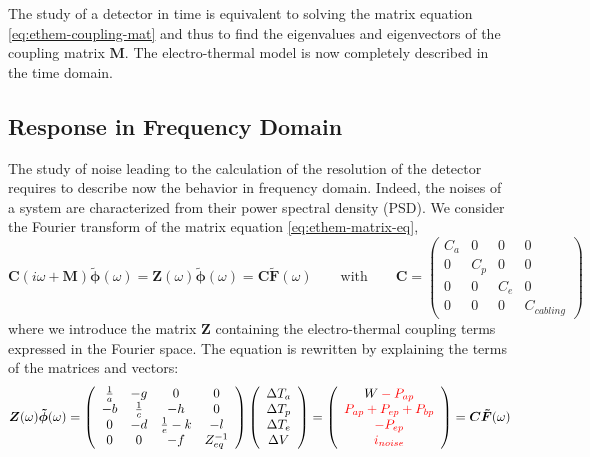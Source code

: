 The study of a detector in time is equivalent to solving the matrix equation \ref{eq:ethem-coupling-mat} and thus to find the eigenvalues and eigenvectors of the coupling matrix $\bm{M}$. The electro-thermal model is now completely described in the time domain.


\subsection{Response in Frequency Domain}
\label{par:ethem-frequency-domain}

The study of noise leading to the calculation of the resolution of the detector requires to describe now the behavior in frequency domain. Indeed, the noises of a system are characterized from their power spectral density (PSD).
We consider the Fourier transform of the matrix equation \ref{eq:ethem-matrix-eq},
\begin{equation}
\bm{C} (i\omega + \bm{M})  \bm{\tilde{\phi}}  (\omega) = \bm{Z} (\omega) \bm{\tilde{\phi}} (\omega)  = \bm{C} \bm{\tilde{F}} (\omega) \qquad \textrm{with} \qquad \bm{C} = \left( \begin{array}{cccc}
 C_a&0&0&0 \\
0&C_p&0&0\\
0&0&C_e&0\\
0&0&0&C_{cabling}
\end{array} \right)
\end{equation}
where we introduce the matrix $\bm{Z}$ containing the electro-thermal coupling terms expressed in the Fourier space. The equation is rewritten by explaining the terms of the matrices and vectors: 
\begin{equation}
\label{z-mat}
\bm{Z} (\omega) \bm{\tilde{\phi}} (\omega) =
\left( \begin{array}{cccc}
 \frac{1}{a}&-g&0&0 \\
-b&\frac{1}{c}&-h&0\\
0&-d&\frac{1}{e}-k&-l\\
0&0&-f&Z_{eq}^{-1}
\end{array} \right)
\left( \begin{array}{c}
\Delta T_a\\
\Delta T_p\\
\Delta T_e\\
\Delta V
\end{array} \right)
 =
\left( \begin{array}{c}
W\begingroup\color{red} - P_{ap}\endgroup\\
\begingroup\color{red}  P_{ap} + P_{ep} + P_{bp}\endgroup\\
\begingroup\color{red} - P_{ep}\endgroup\\
\begingroup\color{red}  i_{noise} \endgroup
\end{array} \right)
=  \bm{C} \bm{\tilde{F}} (\omega)
\end{equation}

